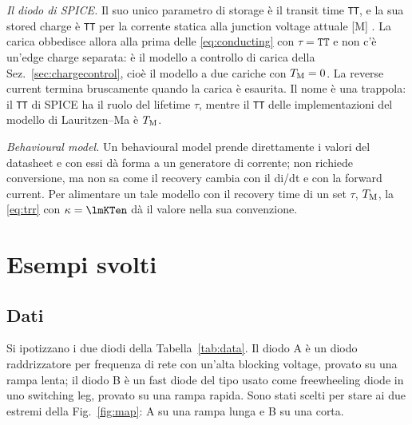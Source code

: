 \documentclass[10pt,a4paper]{scrartcl}
\let\newcommand\pdvaluedefine
\newcommand{\TM}{T_\mathrm{M}}
\begin{document}
\emph{Il diodo di SPICE.} Il suo unico parametro di storage è il transit time \texttt{TT}, e la sua stored charge è \texttt{TT} per la corrente statica alla junction voltage attuale [M] \cite{nagel1975}. La carica obbedisce allora alla prima delle \eqref{eq:conducting} con $\tau = \texttt{TT}$ e non c'è un'edge charge separata: è il modello a controllo di carica della Sez.~\ref{sec:chargecontrol}, cioè il modello a due cariche con $\TM = 0$. La reverse current termina bruscamente quando la carica è esaurita. Il nome è una trappola: il \texttt{TT} di SPICE ha il ruolo del lifetime $\tau$, mentre il \texttt{TT} delle implementazioni del modello di Lauritzen--Ma è $\TM$.

\emph{Behavioural model.} Un behavioural model prende direttamente i valori del datasheet e con essi dà forma a un generatore di corrente; non richiede conversione, ma non sa come il recovery cambia con il di/dt e con la forward current. Per alimentare un tale modello con il recovery time di un set $\tau$, $\TM$, la \eqref{eq:trr} con $\kappa = \lmKTen$ dà il valore nella sua convenzione.

\section{Esempi svolti}
\label{sec:examples}
\subsection{Dati}
Si ipotizzano i due diodi della Tabella~\ref{tab:data}. Il diodo A è un diodo raddrizzatore per frequenza di rete con un'alta blocking voltage, provato su una rampa lenta; il diodo B è un fast diode del tipo usato come freewheeling diode in uno switching leg, provato su una rampa rapida. Sono stati scelti per stare ai due estremi della Fig.~\ref{fig:map}: A su una rampa lunga e B su una corta.
\end{document}
